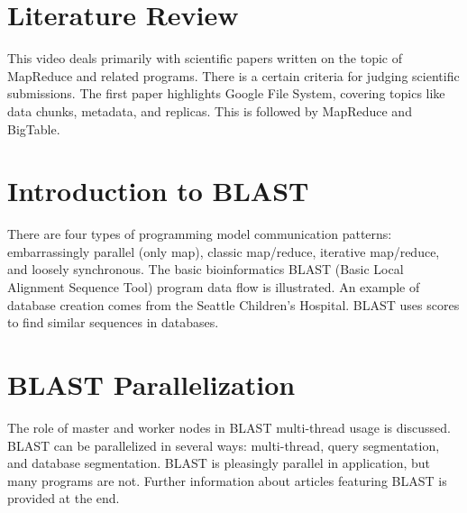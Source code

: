 \section{Literature Review}

This video deals primarily with scientific papers written on the topic
of MapReduce and related programs. There is a certain criteria for
judging scientific submissions. The first paper highlights Google File
System, covering topics like data chunks, metadata, and replicas. This
is followed by MapReduce and BigTable.




\section{Introduction to BLAST}

There are four types of programming model communication patterns:
embarrassingly parallel (only map), classic map/reduce, iterative
map/reduce, and loosely synchronous. The basic bioinformatics BLAST
(Basic Local Alignment Sequence Tool) program data flow is illustrated.
An example of database creation comes from the Seattle Children's
Hospital. BLAST uses scores to find similar sequences in databases.




\section{BLAST Parallelization}

The role of master and worker nodes in BLAST multi-thread usage is
discussed. BLAST can be parallelized in several ways: multi-thread,
query segmentation, and database segmentation. BLAST is pleasingly
parallel in application, but many programs are not. Further information
about articles featuring BLAST is provided at the end.

